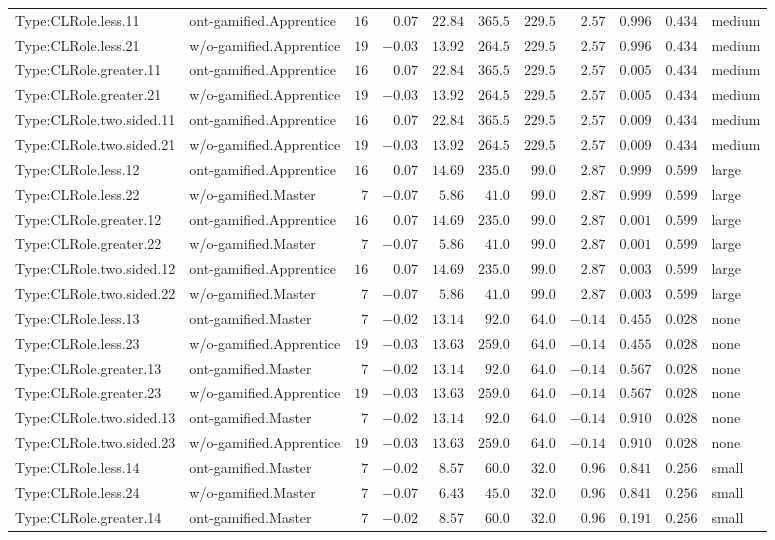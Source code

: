 \documentclass[6pt,a4paper]{article}
\begin{document}
{\begin{longtable}{llrrrrrrrrl}
Type:CLRole.less.11&ont-gamified.Apprentice&$16$&$ 0.07$&$22.84$&$365.5$&$229.5$&$ 2.57$&$0.996$&$0.434$&medium\tabularnewline
Type:CLRole.less.21&w/o-gamified.Apprentice&$19$&$-0.03$&$13.92$&$264.5$&$229.5$&$ 2.57$&$0.996$&$0.434$&medium\tabularnewline
Type:CLRole.greater.11&ont-gamified.Apprentice&$16$&$ 0.07$&$22.84$&$365.5$&$229.5$&$ 2.57$&$0.005$&$0.434$&medium\tabularnewline
Type:CLRole.greater.21&w/o-gamified.Apprentice&$19$&$-0.03$&$13.92$&$264.5$&$229.5$&$ 2.57$&$0.005$&$0.434$&medium\tabularnewline
Type:CLRole.two.sided.11&ont-gamified.Apprentice&$16$&$ 0.07$&$22.84$&$365.5$&$229.5$&$ 2.57$&$0.009$&$0.434$&medium\tabularnewline
Type:CLRole.two.sided.21&w/o-gamified.Apprentice&$19$&$-0.03$&$13.92$&$264.5$&$229.5$&$ 2.57$&$0.009$&$0.434$&medium\tabularnewline
Type:CLRole.less.12&ont-gamified.Apprentice&$16$&$ 0.07$&$14.69$&$235.0$&$ 99.0$&$ 2.87$&$0.999$&$0.599$&large\tabularnewline
Type:CLRole.less.22&w/o-gamified.Master&$ 7$&$-0.07$&$ 5.86$&$ 41.0$&$ 99.0$&$ 2.87$&$0.999$&$0.599$&large\tabularnewline
Type:CLRole.greater.12&ont-gamified.Apprentice&$16$&$ 0.07$&$14.69$&$235.0$&$ 99.0$&$ 2.87$&$0.001$&$0.599$&large\tabularnewline
Type:CLRole.greater.22&w/o-gamified.Master&$ 7$&$-0.07$&$ 5.86$&$ 41.0$&$ 99.0$&$ 2.87$&$0.001$&$0.599$&large\tabularnewline
Type:CLRole.two.sided.12&ont-gamified.Apprentice&$16$&$ 0.07$&$14.69$&$235.0$&$ 99.0$&$ 2.87$&$0.003$&$0.599$&large\tabularnewline
Type:CLRole.two.sided.22&w/o-gamified.Master&$ 7$&$-0.07$&$ 5.86$&$ 41.0$&$ 99.0$&$ 2.87$&$0.003$&$0.599$&large\tabularnewline
Type:CLRole.less.13&ont-gamified.Master&$ 7$&$-0.02$&$13.14$&$ 92.0$&$ 64.0$&$-0.14$&$0.455$&$0.028$&none\tabularnewline
Type:CLRole.less.23&w/o-gamified.Apprentice&$19$&$-0.03$&$13.63$&$259.0$&$ 64.0$&$-0.14$&$0.455$&$0.028$&none\tabularnewline
Type:CLRole.greater.13&ont-gamified.Master&$ 7$&$-0.02$&$13.14$&$ 92.0$&$ 64.0$&$-0.14$&$0.567$&$0.028$&none\tabularnewline
Type:CLRole.greater.23&w/o-gamified.Apprentice&$19$&$-0.03$&$13.63$&$259.0$&$ 64.0$&$-0.14$&$0.567$&$0.028$&none\tabularnewline
Type:CLRole.two.sided.13&ont-gamified.Master&$ 7$&$-0.02$&$13.14$&$ 92.0$&$ 64.0$&$-0.14$&$0.910$&$0.028$&none\tabularnewline
Type:CLRole.two.sided.23&w/o-gamified.Apprentice&$19$&$-0.03$&$13.63$&$259.0$&$ 64.0$&$-0.14$&$0.910$&$0.028$&none\tabularnewline
Type:CLRole.less.14&ont-gamified.Master&$ 7$&$-0.02$&$ 8.57$&$ 60.0$&$ 32.0$&$ 0.96$&$0.841$&$0.256$&small\tabularnewline
Type:CLRole.less.24&w/o-gamified.Master&$ 7$&$-0.07$&$ 6.43$&$ 45.0$&$ 32.0$&$ 0.96$&$0.841$&$0.256$&small\tabularnewline
Type:CLRole.greater.14&ont-gamified.Master&$ 7$&$-0.02$&$ 8.57$&$ 60.0$&$ 32.0$&$ 0.96$&$0.191$&$0.256$&small\tabularnewline

\end{longtable}}
\end{document}

